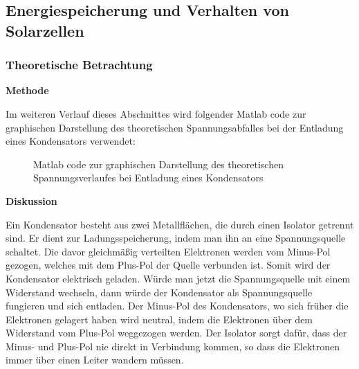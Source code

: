 \subsection {Energiespeicherung und Verhalten von Solarzellen}      %
    \subsubsection{Theoretische Betrachtung}                            %
        \textbf{Methode}
        \newline
        \par
        Im weiteren Verlauf dieses Abschnittes wird folgender Matlab code zur graphischen Darstellung des theoretischen Spannungsabfalles bei der Entladung eines Kondensators verwendet:
        \newline

        \begin{figure}[H]
            
            \caption{Matlab code zur graphischen Darstellung des theoretischen Spannungsverlaufes bei Entladung eines Kondensators}
        \end{figure}

        \textbf{Diskussion}
        \newline
        \par Ein Kondensator besteht aus zwei Metallflächen, die durch einen Isolator getrennt sind. Er dient zur Ladungsspeicherung, indem man ihn an eine Spannungsquelle schaltet. Die davor gleichmäßig verteilten Elektronen werden vom Minus-Pol gezogen, welches mit dem Plus-Pol der Quelle verbunden ist. Somit wird der Kondensator elektrisch geladen. Würde man jetzt die Spannungsquelle mit einem Widerstand wechseln, dann würde der Kondensator als Spannungsquelle fungieren und sich entladen. Der Minus-Pol des Kondensators, wo sich früher die Elektronen gelagert haben wird neutral, indem die Elektronen über dem Widerstand vom Plus-Pol weggezogen werden. Der Isolator sorgt dafür, dass der Minus- und Plus-Pol nie direkt in Verbindung kommen, so dass die Elektronen immer über einen Leiter wandern müssen.
        
